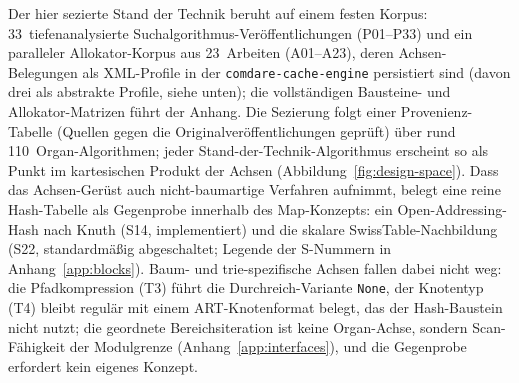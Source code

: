 \begin{nurkurz}
Der hier sezierte Stand der Technik beruht auf einem festen Korpus: 33~tiefenanalysierte
Suchalgorithmus-Veröffentlichungen (P01--P33) und ein paralleler Allokator-Korpus aus 23~Arbeiten (A01--A23),
deren Achsen-Belegungen als XML-Profile in der \texttt{comdare-cache-engine} persistiert sind (davon drei als
abstrakte Profile, siehe unten); die vollständigen Bausteine- und Allokator-Matrizen führt der Anhang. Die
Sezierung folgt einer Provenienz-Tabelle (Quellen gegen die Originalveröffentlichungen geprüft) über rund
110~Organ-Algorithmen; jeder Stand-der-Technik-Algorithmus erscheint so als Punkt im kartesischen Produkt der
Achsen (Abbildung~\ref{fig:design-space}). Dass das Achsen-Gerüst auch nicht-baumartige Verfahren aufnimmt,
belegt eine reine Hash-Tabelle als Gegenprobe innerhalb des Map-Konzepts: ein Open-Addressing-Hash nach Knuth
(S14, implementiert) und die skalare SwissTable-Nachbildung~\cite{abseil_swisstable} (S22, standardmäßig
abgeschaltet; Legende der S-Nummern in Anhang~\ref{app:blocks}). Baum- und trie-spezifische Achsen fallen dabei
nicht weg: die Pfadkompression (T3) führt die Durchreich-Variante \texttt{None}, der Knotentyp (T4) bleibt
regulär mit einem ART-Knotenformat belegt, das der Hash-Baustein nicht nutzt; die geordnete Bereichsiteration
ist keine Organ-Achse, sondern Scan-Fähigkeit der Modulgrenze (Anhang~\ref{app:interfaces}), und die Gegenprobe
erfordert kein eigenes Konzept.
\end{nurkurz}

